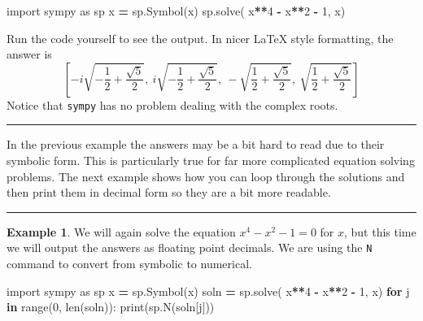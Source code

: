 \documentclass[
]{book}
\newenvironment{Shaded}{\begin{snugshade}}{\end{snugshade}}
\newcommand{\BuiltInTok}[1]{#1}
\newcommand{\ControlFlowTok}[1]{\textcolor[rgb]{0.13,0.29,0.53}{\textbf{#1}}}
\newcommand{\DecValTok}[1]{\textcolor[rgb]{0.00,0.00,0.81}{#1}}
\newcommand{\ImportTok}[1]{#1}
\newcommand{\KeywordTok}[1]{\textcolor[rgb]{0.13,0.29,0.53}{\textbf{#1}}}
\newcommand{\NormalTok}[1]{#1}
\newcommand{\OperatorTok}[1]{\textcolor[rgb]{0.81,0.36,0.00}{\textbf{#1}}}
\newcommand{\StringTok}[1]{\textcolor[rgb]{0.31,0.60,0.02}{#1}}
\theoremstyle{definition}
\theoremstyle{definition}
\newtheorem{example}{Example}[chapter]
\theoremstyle{definition}
\theoremstyle{remark}
\begin{document}
\begin{Shaded}
\begin{Highlighting}[]
\ImportTok{import}\NormalTok{ sympy }\ImportTok{as}\NormalTok{ sp}
\NormalTok{x }\OperatorTok{=}\NormalTok{ sp.Symbol(}\StringTok{\textquotesingle{}x\textquotesingle{}}\NormalTok{)}
\NormalTok{sp.solve( x}\OperatorTok{**}\DecValTok{4} \OperatorTok{{-}}\NormalTok{ x}\OperatorTok{**}\DecValTok{2} \OperatorTok{{-}} \DecValTok{1}\NormalTok{, x)}
\end{Highlighting}
\end{Shaded}

Run the code yourself to see the output. In nicer LaTeX style formatting, the answer is
\[\left[ - i \sqrt{- \frac{1}{2} + \frac{\sqrt{5}}{2}}, \  i \sqrt{- \frac{1}{2} + \frac{\sqrt{5}}{2}}, \  - \sqrt{\frac{1}{2} + \frac{\sqrt{5}}{2}}, \  \sqrt{\frac{1}{2} + \frac{\sqrt{5}}{2}}\right]\]
Notice that \texttt{sympy} has no problem dealing with the complex roots.

\begin{center}\rule{0.5\linewidth}{0.5pt}\end{center}

In the previous example the answers may be a bit hard to read due to their symbolic form. This is particularly true for far more complicated equation solving problems. The next example shows how you can loop through the solutions and then print them in decimal form so they are a bit more readable.

\begin{center}\rule{0.5\linewidth}{0.5pt}\end{center}

\begin{example}
\protect\hypertarget{exm:unnamed-chunk-823}{}{\label{exm:unnamed-chunk-823} }We will again solve the equation \(x^4 - x^2 - 1= 0\) for \(x\), but this time we will output the answers as floating point decimals. We are using the \texttt{N} command to convert from symbolic to numerical.
\end{example}

\begin{Shaded}
\begin{Highlighting}[]
\ImportTok{import}\NormalTok{ sympy }\ImportTok{as}\NormalTok{ sp}
\NormalTok{x }\OperatorTok{=}\NormalTok{ sp.Symbol(}\StringTok{\textquotesingle{}x\textquotesingle{}}\NormalTok{)}
\NormalTok{soln }\OperatorTok{=}\NormalTok{ sp.solve( x}\OperatorTok{**}\DecValTok{4} \OperatorTok{{-}}\NormalTok{ x}\OperatorTok{**}\DecValTok{2} \OperatorTok{{-}} \DecValTok{1}\NormalTok{, x)}
\ControlFlowTok{for}\NormalTok{ j }\KeywordTok{in} \BuiltInTok{range}\NormalTok{(}\DecValTok{0}\NormalTok{, }\BuiltInTok{len}\NormalTok{(soln)):}
    \BuiltInTok{print}\NormalTok{(sp.N(soln[j]))}
\end{Highlighting}
\end{Shaded}
\end{document}
